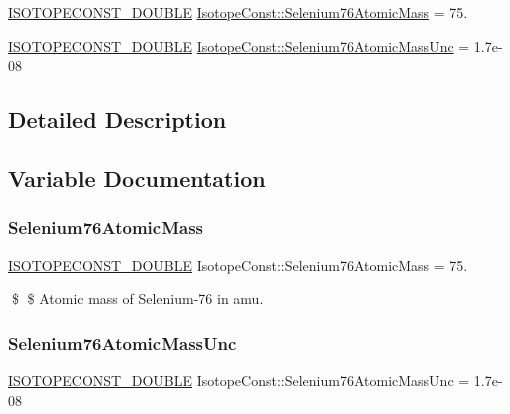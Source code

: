 \begin{DoxyCompactItemize}
\item 
\mbox{\hyperlink{group___isotope_const-_macros_ga8f45a7272ce02c0b4c65c44636ed719a}{I\+S\+O\+T\+O\+P\+E\+C\+O\+N\+S\+T\+\_\+\+D\+O\+U\+B\+LE}} \mbox{\hyperlink{group___isotope_const-_selenium-_se76_gaa4f929ab42498a7d6e7349d98be179a5}{Isotope\+Const\+::\+Selenium76\+Atomic\+Mass}} = 75.
\item 
\mbox{\hyperlink{group___isotope_const-_macros_ga8f45a7272ce02c0b4c65c44636ed719a}{I\+S\+O\+T\+O\+P\+E\+C\+O\+N\+S\+T\+\_\+\+D\+O\+U\+B\+LE}} \mbox{\hyperlink{group___isotope_const-_selenium-_se76_ga08e6f7c86b7441fbae91dd856187494d}{Isotope\+Const\+::\+Selenium76\+Atomic\+Mass\+Unc}} = 1.\+7e-\/08
\end{DoxyCompactItemize}


\subsection{Detailed Description}


\subsection{Variable Documentation}
\mbox{\label{group___isotope_const-_selenium-_se76_gaa4f929ab42498a7d6e7349d98be179a5}} 
\subsubsection{\texorpdfstring{Selenium76\+Atomic\+Mass}{Selenium76AtomicMass}}
{\footnotesize\ttfamily \mbox{\hyperlink{group___isotope_const-_macros_ga8f45a7272ce02c0b4c65c44636ed719a}{I\+S\+O\+T\+O\+P\+E\+C\+O\+N\+S\+T\+\_\+\+D\+O\+U\+B\+LE}} Isotope\+Const\+::\+Selenium76\+Atomic\+Mass = 75.}

\$ \$ Atomic mass of Selenium-\/76 in amu. \mbox{\label{group___isotope_const-_selenium-_se76_ga08e6f7c86b7441fbae91dd856187494d}} 
\subsubsection{\texorpdfstring{Selenium76\+Atomic\+Mass\+Unc}{Selenium76AtomicMassUnc}}
{\footnotesize\ttfamily \mbox{\hyperlink{group___isotope_const-_macros_ga8f45a7272ce02c0b4c65c44636ed719a}{I\+S\+O\+T\+O\+P\+E\+C\+O\+N\+S\+T\+\_\+\+D\+O\+U\+B\+LE}} Isotope\+Const\+::\+Selenium76\+Atomic\+Mass\+Unc = 1.\+7e-\/08}


